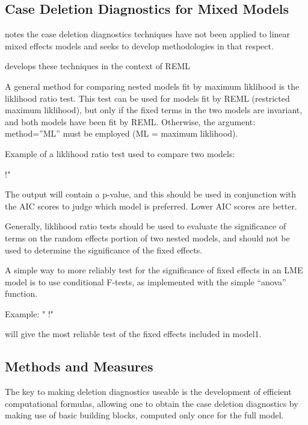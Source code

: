 \documentclass[12pt, a4paper]{report}
\begin{document}
\subsection{Case Deletion Diagnostics for Mixed Models}

\citet{Christiansen} notes the case deletion diagnostics techniques have not been applied to linear mixed effects models and seeks to develop methodologies in that respect.

\citet{Christiansen} develops these techniques in the context of REML

\newpage




A general method for comparing nested models fit by maximum liklihood is the liklihood ratio 
test. This test can be used for models fit by REML (restricted maximum liklihood), but only if the 
fixed terms in the two models are invariant, and both models have been fit by REML. Otherwise, 
the argument: method=”ML” must be employed (ML = maximum liklihood). 

Example of a liklihood ratio test used to compare two models: 

!"%

The output will contain a p-value, and this should be used in conjunction with the AIC scores to 
judge which model is preferred. Lower AIC scores are better. 

Generally, liklihood ratio tests should be used to evaluate the significance of terms on the 
random effects portion of two nested models, and should not be used to determine the 
significance of the fixed effects. 

A simple way to more reliably test for the significance of fixed effects in an LME model is to use 
conditional F-tests, as implemented with the simple “anova” function. 

Example: 
"
!"%

will give the most reliable test of the fixed effects included in model1. 





\subsection{Methods and Measures}
The key to making deletion diagnostics useable is the development of efficient computational formulas, allowing one to obtain the  case deletion diagnostics by making use of basic building blocks, computed only once for the full model.
\end{document}
